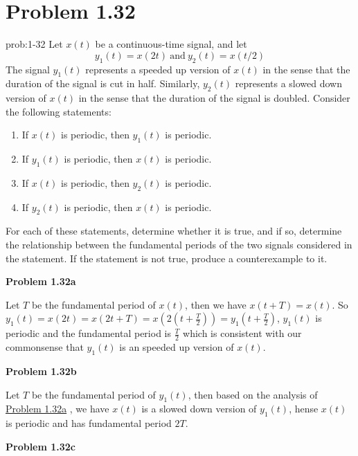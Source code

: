 \documentclass[koma,a4paper,utopia,12pt,listings-color,microtype,paralist,colorlinks,urlcolor=red]{org-article}
\author{Eason}
\date{\today}
\title{}
\begin{document}
\section{Problem 1.32}
\label{sec:orgf15481f}


\begin{prob}[]{prob:1-32}
Let \(x(t)\) be a continuous-time signal, and let
\begin{equation*}
y_{1}(t) = x(2t) \ \mathrm{and} \ y_{2}(t) = x(t/2)
\end{equation*}
The signal \(y_{1}(t)\) represents a speeded up version of \(x(t)\) in the
sense that the duration of the signal is cut in half. Similarly,
\(y_{2}(t)\) represents a slowed down version of \(x(t)\) in the sense that
the duration of the signal is doubled. Consider the following statements:

\begin{enumerate}
\item If \(x(t)\) is periodic, then \(y_{1}(t)\) is periodic.
\item If \(y_{1}(t)\) is periodic, then \(x(t)\) is periodic.
\item If \(x(t)\) is periodic, then \(y_{2}(t)\) is periodic.
\item If \(y_{2}(t)\) is periodic, then \(x(t)\) is periodic.
\end{enumerate}

For each of these statements, determine whether it is true, and if so,
determine the relationship between the fundamental periods of the two
signals considered in the statement. If the statement is not true, produce a
counterexample to it.
\label{prob:1-32}
\end{prob}

\textbf{Problem 1.32a} \label{Problem 1.32a}

Let \(T\) be the fundamental period of \(x(t)\), then we have \(x(t+T) = x(t)\).
So \(y_{1}(t) = x(2t) = x(2t + T) = x(2(t+ \frac{T}{2} ))=
y_{1}(t+\frac{T}{2})\), \(y_{1}(t)\) is periodic and the fundamental period is
\(\frac{T}{2}\) which is consistent with our commonsense that \(y_{1}(t)\) is an
speeded up version of \(x(t)\).

\textbf{Problem 1.32b}

Let \(T\) be the fundamental period of \(y_{1}(t)\), then based on the analysis
of \hyperref[Problem 1.32a]{Problem 1.32a} , we have \(x(t)\) is a slowed down version of \(y_{1}(t)\),
hense \(x(t)\) is periodic and has fundamental period \(2T\).

\textbf{Problem 1.32c} \label{Problem 1.32c}
\end{document}
